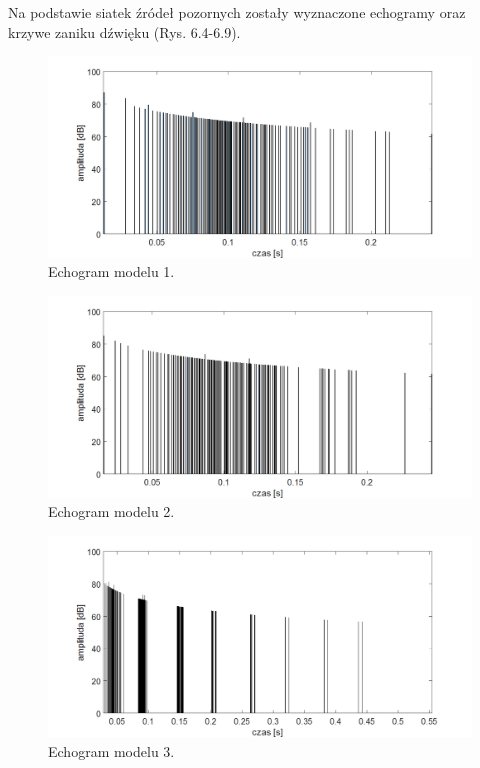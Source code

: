 Na podstawie siatek źródeł pozornych zostały wyznaczone echogramy oraz krzywe zaniku dźwięku (Rys. 6.4-6.9).

\begin{figure}[H]
        \centering
                \centering
                \includegraphics[width=16cm]{echo1}
	\caption{Echogram modelu 1.}
\end{figure}

\begin{figure}[H]
        \centering
                \centering
                \includegraphics[width=16cm]{echo2}
	\caption{Echogram modelu 2.}
\end{figure}

\begin{figure}[H]
        \centering
                \centering
                \includegraphics[width=16cm]{echo3}
	\caption{Echogram modelu 3.}
\end{figure}

